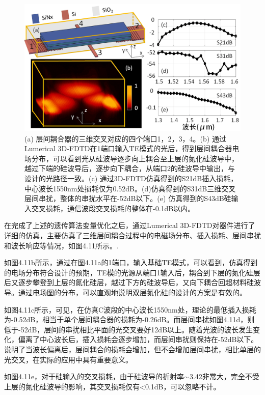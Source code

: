\begin{figure}[!htbp]
    \centering
    \includegraphics[width=1\textwidth]{Img/4-11.png}
    \caption{(a) 层间耦合器的三维交叉对应的四个端口1，2，3，4。(b) 通过Lumerical 3D-FDTD在1端口输入TE模式的光后，得到层间耦合器电场分布，可以看到光从硅波导逐步向上耦合至上层的氮化硅波导中，越过下端的硅波导后，逐步向下耦合，从端口2的硅波导中输出，与设计的光路径一致。(c) 通过3D-FDTD仿真得到的S21dB插入损耗，中心波长1550nm处损耗仅为0.52dB。(d)仿真得到的S31dB三维交叉层间串扰，整体的串扰水平在-52dB以下。(e) 仿真得到的S43dB硅输入交叉损耗，通信波段交叉损耗的整体在-0.1dB以内。}
    \label{fig:4-11}
\end{figure}

在完成了上述的遗传算法变量优化之后，通过Lumerical 3D-FDTD对器件进行了详细的仿真，主要仿真了三维层间耦合过程中的电磁场分布、插入损耗、层间串扰和波长响应等情况，如图4.11所示。.

如图4.11b所示，通过在图4.11a的1端口，输入基础TE模式，可以看到，仿真得到的电场分布符合设计的预期，TE模的光源从端口1输入后，耦合到下层的氮化硅层后又逐步攀登到上层的氮化硅层，越过下方的硅波导后，又向下耦合回超材料硅波导。通过电场图的分布，可以直观地说明双层氮化硅的设计的方案是有效的。

如图4.11c所示，可见，在仿真C波段的中心波长1550nm处，理论的最低插入损耗为-0.52dB，相当于单个层间耦合器的损耗为-0.26dB。而层间串扰如图4.11d，则低于-52dB，层间的串扰相比平面的光交叉要好12dB以上。随着光波的波长发生变化，偏离了中心波长后，插入损耗会逐步增加，而层间串扰则保持在-52dB以下。说明了当波长偏离后，层间耦合的损耗会增加，但不会增加层间串扰，相比单层的光交叉，在实际的应用中具有重要意义。

如图4.11e，对于硅输入的交叉损耗，由于硅波导的折射率$\sim$3.42非常大，完全不受上层的氮化硅波导的影响，其交叉损耗仅有<0.1dB，可以忽略不计。

